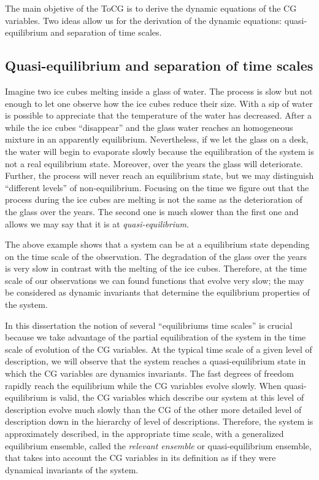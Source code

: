 \documentclass[b5paper,openright,11pt]{book}
\begin{document}
The main objetive of the ToCG is to derive the dynamic equations of the CG variables. Two ideas allow us for the derivation of the dynamic equations: quasi-equilibrium and separation of time scales.

\subsection{Quasi-equilibrium and separation of time scales}
Imagine two ice cubes melting inside a glass of water. 
The process is slow but not enough to let one observe how the ice cubes reduce their size. 
With a sip of water is possible to appreciate that the temperature of the water has decreased. 
After a while the ice cubes ``disappear'' and the glass water reaches an homogeneous mixture in an apparently equilibrium. 
Nevertheless, if we let the glass on a desk, the water will begin to evaporate slowly because the equilibration of the system is not a real equilibrium state. 
Moreover, over the years the glass will deteriorate. 
Further, the process will never reach an equilibrium state, but we may distinguish ``different levels'' of non-equilibrium. 
Focusing on the time we figure out that the process during the ice cubes are melting is not the same as the deterioration of the glass over the years.
The second one is much slower than the first one and allows we may say that it is at {\it quasi-equilibrium}. 

The above example shows that a system can be at a equilibrium state depending on the time scale of the observation. The degradation of the glass over the years is very slow in contrast with the melting of the ice cubes. Therefore, at the time scale of our observations we can found functions that evolve very slow; the may be considered as dynamic invariants that determine the equilibrium properties of the system. 

In this dissertation the notion of several ``equilibriums time scales'' is crucial because we take advantage of the partial equilibration of the system in the time scale of evolution of the CG variables. 
At the typical time scale of a given level of description, we will observe that the system reaches a quasi-equilibrium state in which the CG variables are dynamics invariants. 
The fast degrees of freedom rapidly reach the equilibrium while the CG variables evolve slowly. 
When quasi-equilibrium is valid, the CG variables which describe our system at this level of description evolve much slowly than the CG of the other more detailed level of description down in the hierarchy of level of descriptions. 
Therefore, the system is approximately described, in the appropriate time scale, with a generalized equilibrium ensemble, called the {\it relevant ensemble} or quasi-equilibrium ensemble, that takes into account the CG variables in its definition as if they were dynamical invariants of the system.
\end{document}
